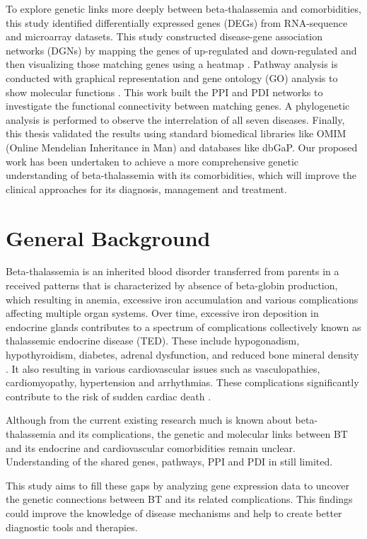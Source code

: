 To explore genetic links more deeply between beta-thalassemia and comorbidities, this study identified differentially expressed genes (DEGs) from RNA-sequence and microarray datasets. This study constructed disease-gene association networks (DGNs) by mapping the genes of up-regulated and down-regulated and then visualizing those matching genes using a heatmap \cite{b3}. Pathway analysis is conducted with graphical representation and gene ontology (GO) analysis to show molecular functions \cite{b3}. This work built the PPI and PDI networks to investigate the functional connectivity between matching genes. A phylogenetic analysis is performed to observe the interrelation of all seven diseases. Finally, this thesis validated the results using standard biomedical libraries like OMIM (Online Mendelian Inheritance in Man) and databases like dbGaP. Our proposed work has been undertaken to achieve a more comprehensive genetic understanding of beta-thalassemia with its comorbidities, which will improve the clinical approaches for its diagnosis, management and treatment.

\section{General Background}
\label{sec:sec1_2}
Beta-thalassemia is an inherited blood disorder transferred from parents in a received patterns that is characterized by absence of beta-globin production, which resulting in anemia, excessive iron accumulation and various complications affecting multiple organ systems. Over time, excessive iron deposition in endocrine glands contributes to a spectrum of complications collectively known as thalassemic endocrine disease (TED). These include hypogonadism, hypothyroidism, diabetes, adrenal dysfunction, and reduced bone mineral density \cite{b11}. It also resulting in various cardiovascular issues such as vasculopathies, cardiomyopathy, hypertension and arrhythmias. These complications significantly contribute to the risk of sudden cardiac death \cite{b12}. 

Although from the current existing research much is known about beta-thalassemia and its complications, the genetic and molecular links between BT and its endocrine and cardiovascular comorbidities remain unclear. Understanding of the shared genes, pathways, PPI and PDI in still limited. 

This study aims to fill these gaps by analyzing gene expression data to uncover the genetic connections between BT and its related complications. This findings could improve the knowledge of disease mechanisms and help to create better diagnostic tools and therapies.
 
